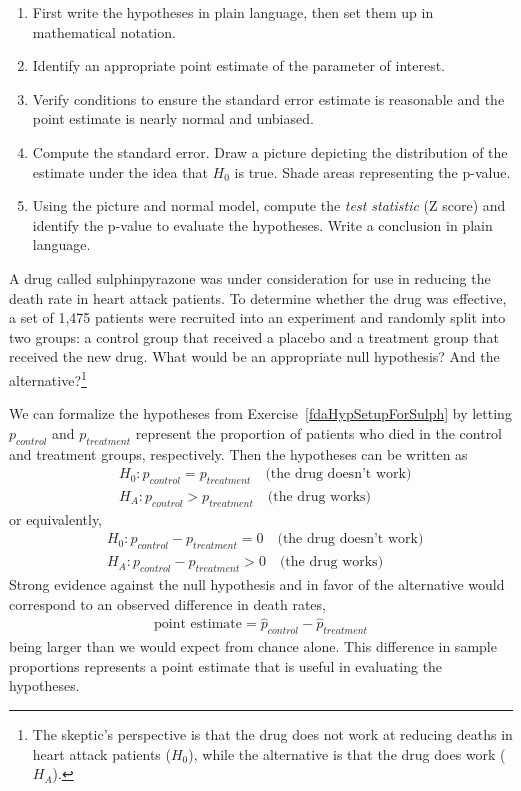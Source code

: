 \begin{termBox}{
\begin{enumerate}
\setlength{\itemsep}{0mm}
\item First write the hypotheses in plain language, then set them up in mathematical notation.
\item Identify an appropriate point estimate of the parameter of interest.
\item Verify conditions to ensure the standard error estimate is reasonable and the point estimate is nearly normal and unbiased.
\item Compute the standard error. Draw a picture depicting the distribution of the estimate under the idea that $H_0$ is true. Shade areas representing the p-value.
\item Using the picture and normal model, compute the \emph{test statistic} (Z score) and identify the p-value to evaluate the hypotheses. Write a conclusion in plain language.
\end{enumerate}}
\end{termBox}

\begin{exercise} \label{fdaHypSetupForSulph}
A drug called sulphinpyrazone was under consideration for use in reducing the death rate in heart attack patients. To determine whether the drug was effective, a set of 1,475 patients were recruited into an experiment and randomly split into two groups: a control group that received a placebo and a treatment group that received the new drug. What would be an appropriate null hypothesis? And the alternative?\footnote{The skeptic's perspective is that the drug does not work at reducing deaths in heart attack patients ($H_0$), while the alternative is that the drug does work ($H_A$).}
\end{exercise}

We can formalize the hypotheses from Exercise~\ref{fdaHypSetupForSulph} by letting $p_{control}$ and $p_{treatment}$ represent the proportion of patients who died in the control and treatment groups, respectively. Then the hypotheses can be written as
\begin{eqnarray*}
&&H_0: p_{control} = p_{treatment} \quad\text{(the drug doesn't work)} \quad \\
&&H_A: p_{control} > p_{treatment} \quad\text{(the drug works)}
\end{eqnarray*}
or equivalently,
\begin{eqnarray*}
&&H_0: p_{control} - p_{treatment} = 0 \quad\text{(the drug doesn't work)} \quad \\
&&H_A: p_{control} - p_{treatment} > 0 \quad\text{(the drug works)}
\end{eqnarray*}
Strong evidence against the null hypothesis and in favor of the alternative would correspond to an observed difference in death rates,
\begin{eqnarray*}
\text{point estimate} = \hat{p}_{control} - \hat{p}_{treatment}
\end{eqnarray*}
being larger than we would expect from chance alone. This difference in sample proportions represents a point estimate that is useful in evaluating the hypotheses. 

